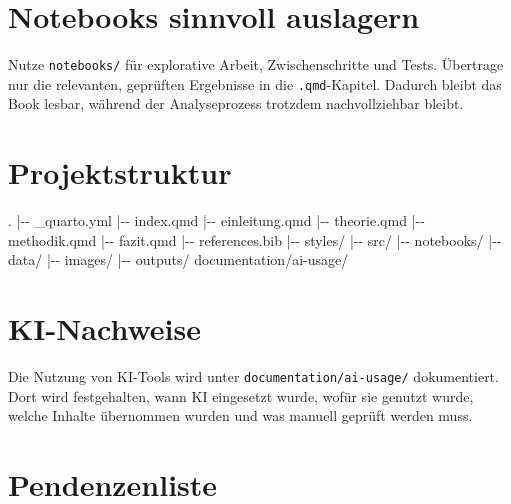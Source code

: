 \documentclass[
  ngerman,
  a4paper,
  DIV=11,
  oneside]{scrreprt}
\newenvironment{Shaded}{\begin{snugshade}}{\end{snugshade}}
\newcommand{\NormalTok}[1]{\textcolor[rgb]{0.00,0.23,0.31}{#1}}
\begin{document}
\section{Notebooks sinnvoll
auslagern}\label{notebooks-sinnvoll-auslagern}

Nutze \texttt{notebooks/} für explorative Arbeit, Zwischenschritte und
Tests. Übertrage nur die relevanten, geprüften Ergebnisse in die
\texttt{.qmd}-Kapitel. Dadurch bleibt das Book lesbar, während der
Analyseprozess trotzdem nachvollziehbar bleibt.

\section{Projektstruktur}\label{projektstruktur}

\begin{Shaded}
\begin{Highlighting}[]
\NormalTok{.}
\NormalTok{|{-}{-} \_quarto.yml}
\NormalTok{|{-}{-} index.qmd}
\NormalTok{|{-}{-} einleitung.qmd}
\NormalTok{|{-}{-} theorie.qmd}
\NormalTok{|{-}{-} methodik.qmd}
\NormalTok{|{-}{-} fazit.qmd}
\NormalTok{|{-}{-} references.bib}
\NormalTok{|{-}{-} styles/}
\NormalTok{|{-}{-} src/}
\NormalTok{|{-}{-} notebooks/}
\NormalTok{|{-}{-} data/}
\NormalTok{|{-}{-} images/}
\NormalTok{|{-}{-} outputs/}
\NormalTok{\textasciigrave{}{-}{-} documentation/ai{-}usage/}
\end{Highlighting}
\end{Shaded}

\section{KI-Nachweise}\label{ki-nachweise}

Die Nutzung von KI-Tools wird unter \texttt{documentation/ai-usage/}
dokumentiert. Dort wird festgehalten, wann KI eingesetzt wurde, wofür
sie genutzt wurde, welche Inhalte übernommen wurden und was manuell
geprüft werden muss.

\section{Pendenzenliste}\label{pendenzenliste}
\end{document}
